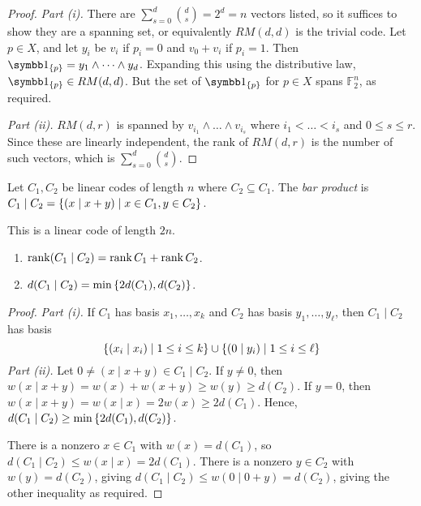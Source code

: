 \begin{proof}
    \emph{Part (i).}
    There are \( \sum_{s=0}^d \binom{d}{s} = 2^d = n \) vectors listed, so it suffices to show they are a spanning set, or equivalently \( RM(d,d) \) is the trivial code.
    Let \( p \in X \), and let \( y_i \) be \( v_i \) if \( p_i = 0 \) and \( v_0 + v_i \) if \( p_i = 1 \).
    Then \( \symbb 1_{\qty{p}} = y_1 \wedge \dots \wedge y_d \).
    Expanding this using the distributive law, \( \symbb 1_{\qty{p}} \in RM(d,d) \).
    But the set of \( \symbb 1_{\qty{p}} \) for \( p \in X \) spans \( \mathbb F_2^n \), as required.

    \emph{Part (ii).}
    \( RM(d,r) \) is spanned by \( v_{i_1} \wedge \dots \wedge v_{i_s} \) where \( i_1 < \dots < i_s \) and \( 0 \leq s \leq r \).
    Since these are linearly independent, the rank of \( RM(d,r) \) is the number of such vectors, which is \( \sum_{s=0}^d \binom{d}{s} \).
\end{proof}
\begin{definition}
    Let \( C_1, C_2 \) be linear codes of length \( n \) where \( C_2 \subseteq C_1 \).
    The \emph{bar product} is \( C_1 \mid C_2 = \qty{(x \mid x + y) \mid x \in C_1, y \in C_2} \).
\end{definition}
This is a linear code of length \( 2n \).
\begin{lemma}
    \begin{enumerate}
        \item \( \rank (C_1 \mid C_2) = \rank C_1 + \rank C_2 \).
        \item \( d(C_1 \mid C_2) = \min \qty{2d(C_1), d(C_2)} \).
    \end{enumerate}
\end{lemma}
\begin{proof}
    \emph{Part (i).}
    If \( C_1 \) has basis \( x_1, \dots, x_k \) and \( C_2 \) has basis \( y_1, \dots, y_\ell \), then \( C_1 \mid C_2 \) has basis
    \[ \qty{(x_i \mid x_i) \mid 1 \leq i \leq k} \cup \qty{(0 \mid y_i) \mid 1 \leq i \leq \ell} \]
    \emph{Part (ii).}
    Let \( 0 \neq (x \mid x + y) \in C_1 \mid C_2 \).
    If \( y \neq 0 \), then \( w(x \mid x + y) = w(x) + w(x + y) \geq w(y) \geq d(C_2) \).
    If \( y = 0 \), then \( w(x \mid x + y) = w(x \mid x) = 2w(x) \geq 2d(C_1) \).
    Hence, \( d(C_1 \mid C_2) \geq \min\qty{2d(C_1), d(C_2)} \).

    There is a nonzero \( x \in C_1 \) with \( w(x) = d(C_1) \), so \( d(C_1 \mid C_2) \leq w(x \mid x) = 2d(C_1) \).
    There is a nonzero \( y \in C_2 \) with \( w(y) = d(C_2) \), giving \( d(C_1 \mid C_2) \leq w(0 \mid 0 + y) = d(C_2) \), giving the other inequality as required.
\end{proof}
